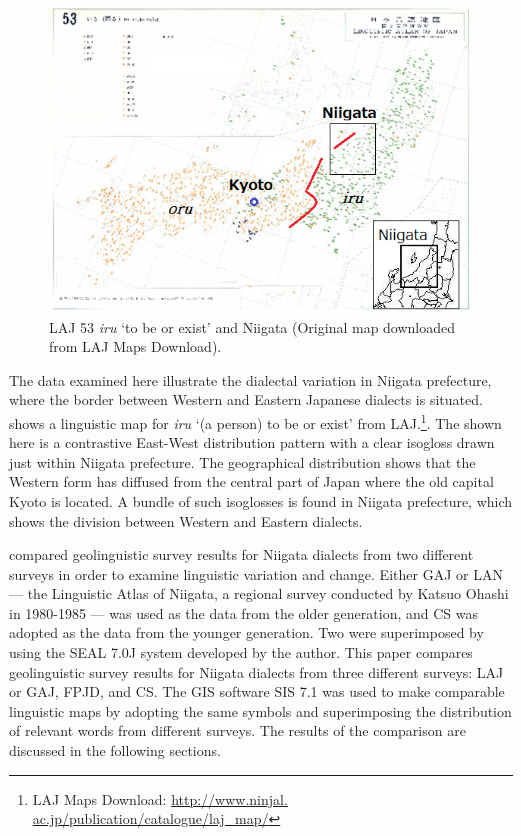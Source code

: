 \documentclass[output=paper]{LSP/langsci}
\begin{document}
\begin{figure}
\includegraphics[width=1\textwidth]{illustrations/fuku2_fig1}
\caption{\textsc{LAJ} 53 \textit{iru} `to be or exist' and Niigata (Original map downloaded from \textsc{LAJ} Maps Download).}
\label{fig:1}
\end{figure}

The data examined here illustrate the dialectal variation in Niigata prefecture, where the border between Western and Eastern Japanese dialects is situated.  shows a linguistic map for \textit{iru} `(a person) to be or exist' from \textsc{LAJ}.\footnote{\textsc{LAJ} Maps Download: \url{http://www.ninjal. ac.jp/publication/catalogue/laj\_map/}}.  The  shown here is a contrastive East-West distribution pattern with a clear isogloss drawn just within Niigata prefecture.  The geographical distribution shows that the Western form has diffused from the central part of Japan where the old capital Kyoto is located.  A bundle of such isoglosses is found in Niigata prefecture, which shows the division between Western and Eastern dialects.

\citet{fukushima_superimposing_2007} compared geolinguistic survey results for Niigata dialects from two different surveys in order to examine linguistic variation and change.  Either \textsc{GAJ} or LAN --- the Linguistic Atlas of Niigata, a regional survey conducted by Katsuo Ohashi in 1980-1985 \citep{ohashi_linguistic_1998} --- was used as the data from the older generation, and \textsc{CS} was adopted as the data from the younger generation.  Two  were superimposed by using the SEAL 7.0J system developed by the author.  This paper compares geolinguistic survey results for Niigata dialects from three different surveys: \textsc{LAJ} or \textsc{GAJ}, \textsc{FPJD}, and \textsc{CS}.  The \textsc{GIS} software SIS 7.1 was used to make comparable linguistic maps by adopting the same symbols and superimposing the distribution of relevant words from different surveys.  The results of the comparison are discussed in the following sections.
\end{document}
